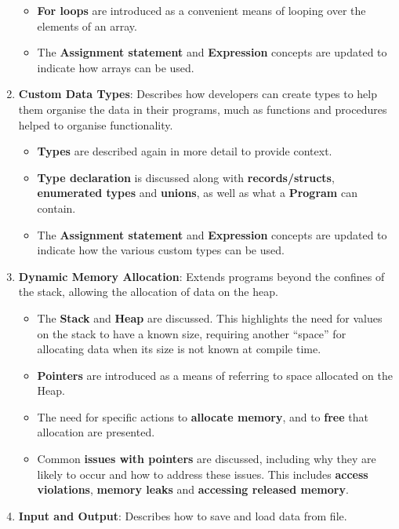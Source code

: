 \begin{enumerate}
\begin{itemize}[noitemsep,nolistsep]
    \item \textbf{For loops} are introduced as a convenient means of looping over the elements of an array. 
    \item The \textbf{Assignment statement} and \textbf{Expression} concepts are updated to indicate how arrays can be used.
  \end{itemize}
  \item \textbf{Custom Data Types}: Describes how developers can create types to help them organise the data in their programs, much as functions and procedures helped to organise functionality.
  \begin{itemize}[noitemsep,nolistsep]
    \item \textbf{Types} are described again in more detail to provide context. 
    \item \textbf{Type declaration} is discussed along with \textbf{records/structs}, \textbf{enumerated types} and \textbf{unions}, as well as what a \textbf{Program} can contain.
    \item The \textbf{Assignment statement} and \textbf{Expression} concepts are updated to indicate how the various custom types can be used.
  \end{itemize}
  \item \textbf{Dynamic Memory Allocation}: Extends programs beyond the confines of the stack, allowing the allocation of data on the heap.
  \begin{itemize}[noitemsep,nolistsep]
    \item The \textbf{Stack} and \textbf{Heap} are discussed. This highlights the need for values on the stack to have a known size, requiring another ``space'' for allocating data when its size is not known at compile time.
    \item \textbf{Pointers} are introduced as a means of referring to space allocated on the Heap.
    \item The need for specific actions to \textbf{allocate memory}, and to \textbf{free} that allocation are presented.
    \item Common \textbf{issues with pointers} are discussed, including why they are likely to occur and how to address these issues. This includes \textbf{access violations}, \textbf{memory leaks} and \textbf{accessing released memory}. 
  \end{itemize}
  \item \textbf{Input and Output}: Describes how to save and load data from file.
  \begin{itemize}

\end{itemize}
\end{enumerate}
